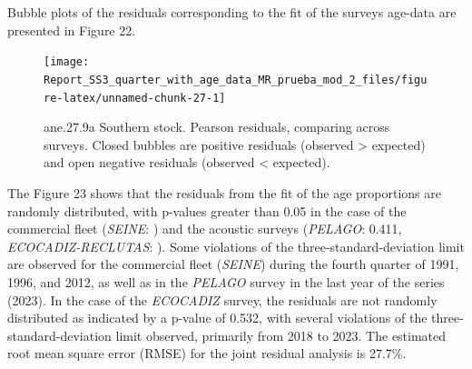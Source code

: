 \documentclass[
]{article}
\begin{document}
Bubble plots of the residuals corresponding to the fit of the surveys
age-data are presented in Figure 22.

\begin{figure}[H]

{\centering \texttt{[image: Report\_SS3\_quarter\_with\_age\_data\_MR\_prueba\_mod\_2\_files/figure-latex/unnamed-chunk-27-1]} 

}

\caption{ane.27.9a Southern stock.  Pearson residuals, comparing across surveys. Closed bubbles are positive residuals (observed > expected) and open negative residuals (observed < expected).}\label{fig:unnamed-chunk-27}
\end{figure}

The Figure 23 shows that the residuals from the fit of the age
proportions are randomly distributed, with p-values greater than 0.05 in
the case of the commercial fleet (\emph{SEINE}: ) and the acoustic
surveys (\emph{PELAGO}: 0.411, \emph{ECOCADIZ-RECLUTAS}: ). Some
violations of the three-standard-deviation limit are observed for the
commercial fleet (\emph{SEINE}) during the fourth quarter of 1991, 1996,
and 2012, as well as in the \emph{PELAGO} survey in the last year of the
series (2023). In the case of the \emph{ECOCADIZ} survey, the residuals
are not randomly distributed as indicated by a p-value of 0.532, with
several violations of the three-standard-deviation limit observed,
primarily from 2018 to 2023. The estimated root mean square error (RMSE)
for the joint residual analysis is 27.7\%.
\end{document}

